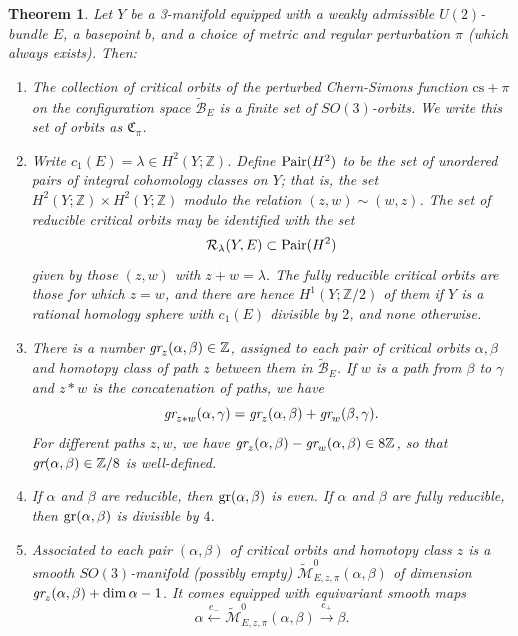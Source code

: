 \documentclass{memo-l}
\newtheorem{theorem}{Theorem}[chapter]
\theoremstyle{definition}
\theoremstyle{remark}
\numberwithin{section}{chapter}
\numberwithin{equation}{chapter}
\begin{document}
\begin{theorem}\label{ModuliPackage}Let $Y$ be a 3-manifold equipped with a weakly admissible $U(2)$-bundle $E$, a basepoint $b$, and a choice of metric and regular perturbation $\pi$ (which always exists). Then:\begin{enumerate}
\item The collection of \emph{critical orbits} of the perturbed Chern-Simons function $\text{cs}+\pi$ on the configuration space $\widetilde{\mathcal B}_E$ is a finite set of $SO(3)$-orbits. We write this set of orbits as $\mathfrak C_\pi$.\\
\item Write $c_1(E) = \lambda \in H^2(Y; \mathbb Z)$. Define $\textup{Pair}(H^2)$ to be the set of unordered pairs of integral cohomology classes on $Y$; that is, the set $H^2(Y;\mathbb Z) \times H^2(Y;\mathbb Z)$ modulo the relation $(z,w) \sim (w,z)$. The set of reducible critical orbits may be identified with the set $$\mathcal R_\lambda(Y,E) \subset\textup{Pair}(H^2)$$ given by those $(z,w)$ with $z+w = \lambda$. The fully reducible critical orbits are those for which $z = w$, and there are hence $H^1(Y;\mathbb Z/2)$ of them if $Y$ is a rational homology sphere with $c_1(E)$ divisible by $2$, and none otherwise. \\
\item There is a number $\text{\em{gr}}_z(\alpha, \beta) \in \mathbb Z$, assigned to each pair of critical orbits $\alpha, \beta$ and homotopy class of path $z$ between them in $\widetilde{\mathcal B}_E$. If $w$ is a path from $\beta$ to $\gamma$ and $z \ast w$ is the concatenation of paths, we have $$\text{\em{gr}}_{z \ast w}(\alpha, \gamma) = \text{\em{gr}}_{z}(\alpha, \beta) + \text{\em{gr}}_{w}(\beta, \gamma).$$ For different paths $z,w$, we have $\text{\em{gr}}_z(\alpha, \beta) - \text{\em{gr}}_w(\alpha, \beta) \in 8\mathbb Z$, so that $\text{\em{gr}}(\alpha, \beta) \in \mathbb Z/8$ is well-defined.\\
\item If $\alpha$ and $\beta$ are reducible, then $\textup{gr}(\alpha, \beta)$ is even. If $\alpha$ and $\beta$ are fully reducible, then $\textup{gr}(\alpha, \beta)$ is divisible by $4$.\\
\item Associated to each pair $(\alpha, \beta)$ of critical orbits and homotopy class $z$ is a smooth $SO(3)$-manifold (possibly empty) $\widetilde{\mathcal M}^0_{E,z,\pi}(\alpha, \beta)$ of dimension $\text{\em{gr}}_{z}(\alpha, \beta)+\dim \alpha-1$. It comes equipped with equivariant smooth maps $$\alpha \xleftarrow{e_-} \widetilde{\mathcal M}^0_{E,z,\pi}(\alpha, \beta) \xrightarrow{e_+} \beta.$$

\end{enumerate}
\end{theorem}
\end{document}
